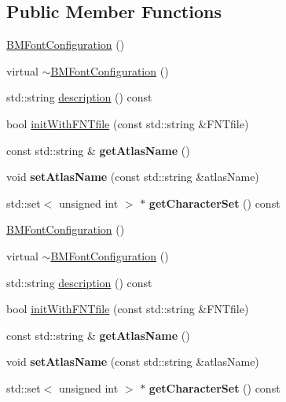 \subsection*{Public Member Functions}
\begin{DoxyCompactItemize}
\item 
\hyperlink{group__label_ga04b6c1a932298f09e2271950f2da6661}{B\+M\+Font\+Configuration} ()
\item 
virtual \hyperlink{group__label_gad54c7b6ca83e8eaaedfff5ec431b8b11}{$\sim$\+B\+M\+Font\+Configuration} ()
\item 
std\+::string \hyperlink{group__label_gab5b833ca803bff72c9ab19abf55eb8ac}{description} () const
\item 
bool \hyperlink{group__label_ga0eb7f4ea5cc521e1502006c04cc67733}{init\+With\+F\+N\+Tfile} (const std\+::string \&F\+N\+Tfile)
\item 
const std\+::string \& {\bfseries get\+Atlas\+Name} ()
\item 
void {\bfseries set\+Atlas\+Name} (const std\+::string \&atlas\+Name)
\item 
std\+::set$<$ unsigned int $>$ $\ast$ {\bfseries get\+Character\+Set} () const
\item 
\hyperlink{classBMFontConfiguration_ga04b6c1a932298f09e2271950f2da6661}{B\+M\+Font\+Configuration} ()
\item 
virtual \hyperlink{classBMFontConfiguration_gad54c7b6ca83e8eaaedfff5ec431b8b11}{$\sim$\+B\+M\+Font\+Configuration} ()
\item 
std\+::string \hyperlink{classBMFontConfiguration_gab5b833ca803bff72c9ab19abf55eb8ac}{description} () const
\item 
bool \hyperlink{classBMFontConfiguration_ga0eb7f4ea5cc521e1502006c04cc67733}{init\+With\+F\+N\+Tfile} (const std\+::string \&F\+N\+Tfile)
\item 
\mbox{\label{classBMFontConfiguration_gad274de0ea6ede4d07c4a65f03bc4cb25}} 
const std\+::string \& {\bfseries get\+Atlas\+Name} ()
\item 
\mbox{\label{classBMFontConfiguration_ga871cdaaac71c43fa35a62fe9f0c3d3cc}} 
void {\bfseries set\+Atlas\+Name} (const std\+::string \&atlas\+Name)
\item 
\mbox{\label{classBMFontConfiguration_ga039fbd9a15e5e226af6e1dba80108bcf}} 
std\+::set$<$ unsigned int $>$ $\ast$ {\bfseries get\+Character\+Set} () const
\end{DoxyCompactItemize}
